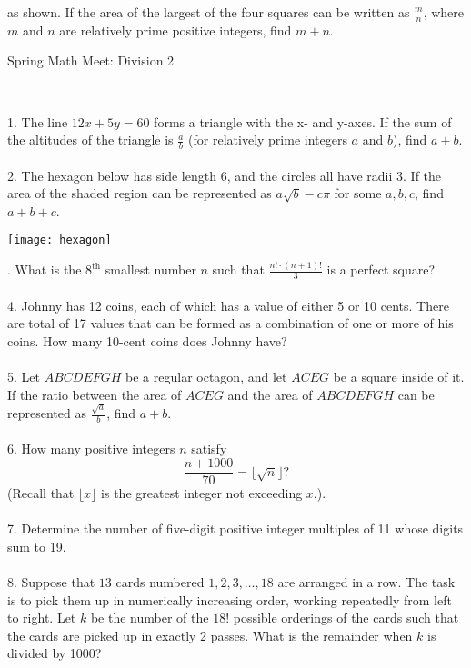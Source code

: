 {as shown. If the area of the largest of the four squares can be written as $\frac{m}{n}$, where $m$ and $n$ are relatively prime positive integers, find $m + n$. \\ 
\noindent 
\begin{center}
    {\huge Spring Math Meet: Division 2} 
\end{center}
\hfill \break \\ 
{\footnotesize 1. The line $12x + 5y = 60$ forms a triangle with the x- and y-axes. If the sum of the altitudes of the triangle is $\frac{a}{b}$ (for relatively prime integers $a$ and $b$), find $a + b$.
\\ \\ 
2. The hexagon below has side length 6, and the circles all have radii 3. If the area of the shaded region can be represented as $a\sqrt{b} - c\pi$ for some $a, b, c$, find $a+b+c$.\\ 
\begin{center}
    \texttt{[image: hexagon]}
\end{center}
\hfill {}. What is the $8^{\text{th}}$ smallest number $n$ such that $\frac{n! \cdot (n+1)!}{3}$ is a perfect square?
\\ \\ 
4. Johnny has 12 coins, each of which has a value of either 5 or 10 cents. There are total of 17 values that can be formed as a combination of one or more of his coins. How many 10-cent coins does Johnny have?
\\ \\
5. Let $ABCDEFGH$ be a regular octagon, and let $ACEG$ be a square inside of it. If the ratio between the area of $ACEG$ and the area of $ABCDEFGH$ can be represented as $\frac{\sqrt{a}}{b}$, find $a+b$.
\\ \\ 
6. How many positive integers $n$ satisfy\[\frac{n+1000}{70} = \lfloor \sqrt{n} \rfloor?\](Recall that $\lfloor x\rfloor$ is the greatest integer not exceeding $x$.).
\\ \\
7. Determine the number of five-digit positive integer multiples of 11 whose digits sum to 19.
\\ \\
8. Suppose that $13$ cards numbered $1, 2, 3, \ldots, 18$ are arranged in a row. The task is to pick them up in numerically increasing order, working repeatedly from left to right. Let $k$ be the number of the $18!$ possible orderings of the cards such that the cards are picked up in exactly 2 passes. What is the remainder when $k$ is divided by 1000?}
}
